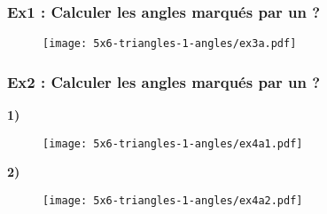 \subsubsection*{Ex1 : Calculer les angles marqués par un ?}

\begin{figure}[H]
  \centering
  \texttt{[image: 5x6-triangles-1-angles/ex3a.pdf]}
\end{figure}

\Pointilles[6]

\subsubsection*{Ex2 : Calculer les angles marqués par un ?}

\begin{multicols}{2}
  \textbf{1)}
  \begin{figure}[H]
    \centering
    \texttt{[image: 5x6-triangles-1-angles/ex4a1.pdf]}
  \end{figure} \columnbreak

  \textbf{2)}
  \begin{figure}[H]
    \centering
    \texttt{[image: 5x6-triangles-1-angles/ex4a2.pdf]}
  \end{figure}
\end{multicols}

\Pointilles[16]



